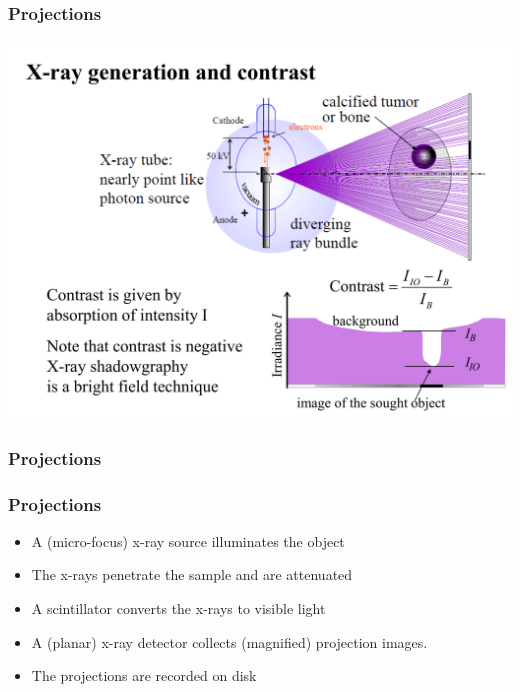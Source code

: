 \begin{frame}[label=current]
	\frametitle{Projections}
	\centering
	\includegraphics[height=\imageheight]{./images/physical_basics_2021-21}%
\end{frame}

\begin{frame}[label=current]
	\frametitle{Projections}
	\centering
\end{frame}

\begin{frame}[label=current]
	\frametitle{Projections}
	\begin{itemize}
		\item A (micro-focus) x-ray source illuminates the object
		\item The x-rays penetrate the sample and are attenuated
		\item A scintillator converts the x-rays to visible light
		\item A (planar) x-ray detector collects (magnified) projection images.
		\item The projections are recorded on disk
	\end{itemize}
\end{frame}

